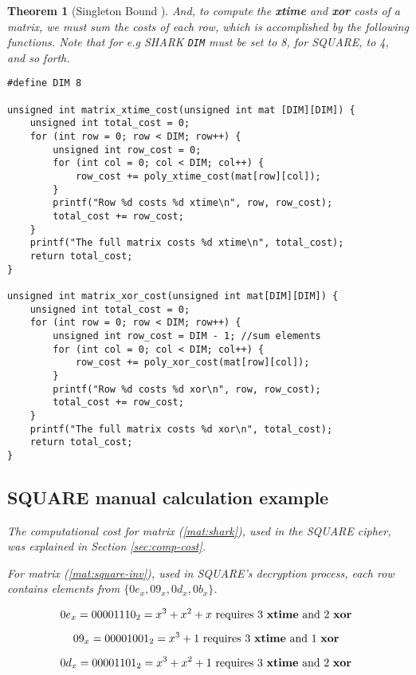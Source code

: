 \documentclass{report}
\newtheorem{theorem}{Theorem}{\bfseries}{\itshape}
\begin{document}
\begin{theorem}[Singleton Bound \cite{SloaneBook}]
And, to compute the \textbf{xtime} and \textbf{xor} costs of a matrix, we must sum the costs of each row, which is accomplished by the following functions. Note that for e.g SHARK \texttt{DIM} must be set to 8, for SQUARE, to 4, and so forth.

\begin{verbatim}
#define DIM 8

unsigned int matrix_xtime_cost(unsigned int mat [DIM][DIM]) {
	unsigned int total_cost = 0;
	for (int row = 0; row < DIM; row++) {
		unsigned int row_cost = 0;
		for (int col = 0; col < DIM; col++) {
			row_cost += poly_xtime_cost(mat[row][col]);
		}
		printf("Row %d costs %d xtime\n", row, row_cost);
		total_cost += row_cost;
	}
	printf("The full matrix costs %d xtime\n", total_cost);
	return total_cost;
}

unsigned int matrix_xor_cost(unsigned int mat[DIM][DIM]) {
	unsigned int total_cost = 0;
	for (int row = 0; row < DIM; row++) {
		unsigned int row_cost = DIM - 1; //sum elements
		for (int col = 0; col < DIM; col++) {
			row_cost += poly_xor_cost(mat[row][col]);
		}
		printf("Row %d costs %d xor\n", row, row_cost);
		total_cost += row_cost;
	}
	printf("The full matrix costs %d xor\n", total_cost);
	return total_cost;
}
\end{verbatim}

\subsection{SQUARE manual calculation example}
The computational cost for matrix (\ref{mat:shark}), used in the SQUARE cipher, was explained in Section \ref{sec:comp-cost}.

For matrix (\ref{mat:square-inv}), used in SQUARE's decryption process, each row contains elements from $\{0e_x, 09_x, 0d_x, 0b_x\}$. 

\begin{equation*}
0e_x = 00001110_2 = x^3 + x^2 + x \text{ requires 3 \textbf{xtime} and 2 \textbf{xor} }
\end{equation*}

\begin{equation*}
09_x = 00001001_2 = x^3 + 1 \text{ requires 3 \textbf{xtime} and 1 \textbf{xor} }
\end{equation*}

\begin{equation*}
0d_x = 00001101_2 = x^3 + x^2 + 1 \text{ requires 3 \textbf{xtime} and 2 \textbf{xor} }
\end{equation*}


\end{theorem}
\end{document}

